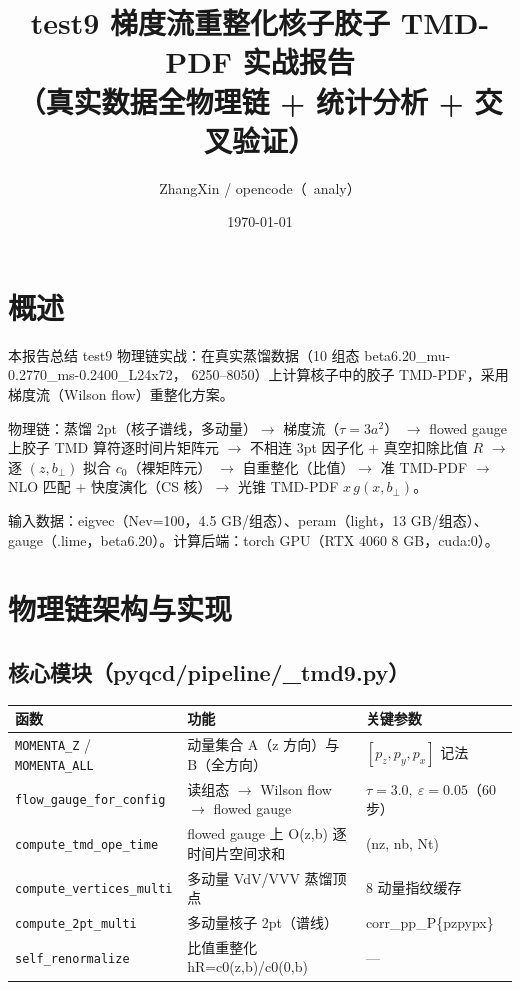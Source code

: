 \documentclass[11pt]{article}
\title{test9 梯度流重整化核子胶子 TMD-PDF 实战报告\\（真实数据全物理链 + 统计分析 + 交叉验证）}
\author{ZhangXin / opencode（~analy）}
\date{\today}
\begin{document}
\maketitle

\section{概述}
本报告总结 test9 物理链实战：在真实蒸馏数据（10 组态 beta6.20\_mu-0.2770\_ms-0.2400\_L24x72，
6250--8050）上计算核子中的胶子 TMD-PDF，采用梯度流（Wilson flow）重整化方案。

物理链：蒸馏 2pt（核子谱线，多动量）$\rightarrow$ 梯度流（$\tau=3a^2$）
$\rightarrow$ flowed gauge 上胶子 TMD 算符逐时间片矩阵元
$\rightarrow$ 不相连 3pt 因子化 + 真空扣除比值 $R$
$\rightarrow$ 逐 $(z,b_\perp)$ 拟合 $c_0$（裸矩阵元）
$\rightarrow$ 自重整化（比值）$\rightarrow$ 准 TMD-PDF
$\rightarrow$ NLO 匹配 + 快度演化（CS 核）$\rightarrow$ 光锥 TMD-PDF $x\,g(x,b_\perp)$。

输入数据：eigvec（Nev=100，4.5 GB/组态）、peram（light，13 GB/组态）、
gauge（.lime，beta6.20）。计算后端：torch GPU（RTX 4060 8 GB，cuda:0）。

\section{物理链架构与实现}
\subsection{核心模块（pyqcd/pipeline/\_tmd9.py）}
\begin{longtable}{lll}
\hline
函数 & 功能 & 关键参数 \\
\hline
\texttt{MOMENTA\_Z} / \texttt{MOMENTA\_ALL} & 动量集合 A（z 方向）与 B（全方向） &
$[p_z,p_y,p_x]$ 记法 \\
\texttt{flow\_gauge\_for\_config} & 读组态 $\rightarrow$ Wilson flow $\rightarrow$ flowed gauge &
$\tau{=}3.0,\ \varepsilon{=}0.05$（60 步） \\
\texttt{compute\_tmd\_ope\_time} & flowed gauge 上 O(z,b) 逐时间片空间求和 & (nz, nb, Nt) \\
\texttt{compute\_vertices\_multi} & 多动量 VdV/VVV 蒸馏顶点 & 8 动量指纹缓存 \\
\texttt{compute\_2pt\_multi} & 多动量核子 2pt（谱线） & corr\_pp\_P\{pzpypx\} \\
\texttt{self\_renormalize} & 比值重整化 hR=c0(z,b)/c0(0,b) & --- \\
\hline
\end{longtable}
\end{document}
